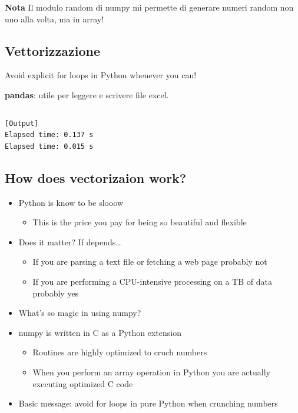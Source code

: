 \textbf{Nota} Il modulo random di numpy mi permette di generare numeri random non uno alla volta, ma in array!

\subsection{Vettorizzazione}
Avoid explicit for loops in Python whenever you can!

\textbf{pandas}: utile per leggere e scrivere file excel.

\inputminted{python}{snippets/vectorization.py}
\begin{verbatim}
[Output]
Elapsed time: 0.137 s
Elapsed time: 0.015 s
\end{verbatim}

\subsection{How does vectorizaion work?}


  \begin{itemize}
  \item Python is know to be slooow
    \begin{itemize}
    \item This is the price you pay for being so beautiful and flexible
    \end{itemize}
  \item Does it matter? If depends\ldots
    \begin{itemize}
    \item If you are parsing a text file or fetching a web page probably not
    \item If you are performing a CPU-intensive processing on a TB of data
      probably yes
    \end{itemize}
  \item What's so magic in using numpy?
  \item numpy is written in C as a Python extension
    \begin{itemize}
    \item Routines are highly optimized to cruch numbers
    \item When you perform an array operation in Python you are actually
      executing optimized C code
    \end{itemize}
  \item \alert{Basic message: avoid for loops in pure Python when
    crunching numbers}
  \end{itemize}

